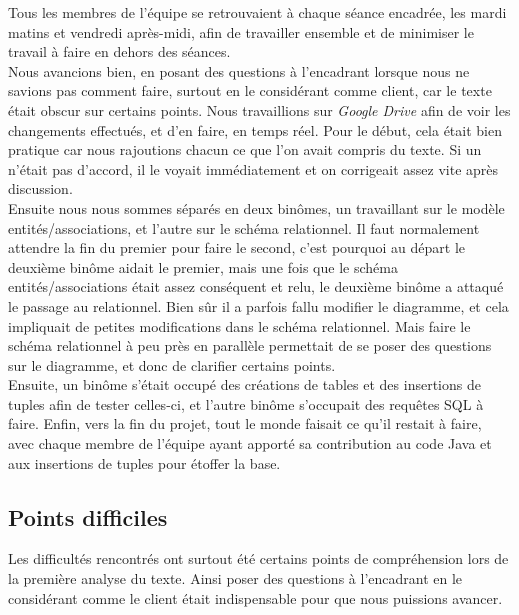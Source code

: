 \documentclass[10pt]{article}
\begin{document}
Tous les membres de l'équipe se retrouvaient à chaque séance encadrée, les mardi matins et vendredi après-midi, afin de travailler 
ensemble et de minimiser le travail à faire en dehors des séances.\\

Nous avancions bien, en posant des questions à l'encadrant lorsque nous ne savions pas comment faire, surtout en le considérant comme
client, car le texte était obscur sur certains points. 
Nous travaillions sur \emph{Google Drive} afin de voir les changements effectués, et d'en faire, en temps réel. Pour le début, cela était
bien pratique car nous rajoutions chacun ce que l'on avait compris du texte. Si un n'était pas d'accord, il le voyait immédiatement et
on corrigeait assez vite après discussion. \\

Ensuite nous nous sommes séparés en deux binômes, un travaillant sur le modèle entités/associations, et l'autre sur le schéma relationnel.
Il faut normalement attendre la fin du premier pour faire le second, c'est pourquoi au départ le deuxième binôme aidait le premier, mais
une fois que le schéma entités/associations était assez conséquent et relu, le deuxième binôme a attaqué le passage au relationnel.
Bien sûr il a parfois fallu modifier le diagramme, et cela impliquait de petites modifications dans le schéma relationnel. Mais faire
le schéma relationnel à peu près en parallèle permettait de se poser des questions sur le diagramme, et donc de clarifier certains
points.\\

Ensuite, un binôme s'était occupé des créations de tables et des insertions de tuples afin de tester celles-ci, et l'autre binôme 
s'occupait des requêtes SQL à faire. Enfin, vers la fin du projet, tout le monde faisait ce qu'il restait à faire, avec chaque membre
de l'équipe ayant apporté sa contribution au code Java et aux insertions de tuples pour étoffer la base.

\subsection{Points difficiles}

Les difficultés rencontrés ont surtout été certains points de compréhension lors de la première analyse du texte. Ainsi poser des questions
à l'encadrant en le considérant comme le client était indispensable pour que nous puissions avancer. \\
\end{document}
